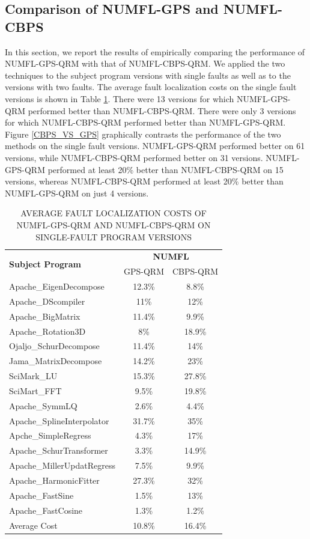 \subsection{Comparison of NUMFL-GPS and NUMFL-CBPS}
In this section, we report the results of empirically comparing the performance of NUMFL-GPS-QRM with that of NUMFL-CBPS-QRM.  We applied the two techniques to the subject program versions with single faults as well as to the versions with two faults.  The average fault localization costs on the single fault versions is shown in Table \ref{table5}.  There were 13 versions for which NUMFL-GPS-QRM performed better than NUMFL-CBPS-QRM. There were only 3 versions for which NUMFL-CBPS-QRM performed better than NUMFL-GPS-QRM. Figure \ref{CBPS_VS_GPS} graphically contrasts the performance of the two methods on the single fault versions.  NUMFL-GPS-QRM performed better on 61 versions, while NUMFL-CBPS-QRM performed better on 31 versions.  NUMFL-GPS-QRM performed at least 20\% better than NUMFL-CBPS-QRM on 15 versions, whereas NUMFL-CBPS-QRM performed at least 20\% better than NUMFL-GPS-QRM on just 4 versions.

\begin{table}[htbp!]
\caption{AVERAGE FAULT LOCALIZATION COSTS OF NUMFL-GPS-QRM AND NUMFL-CBPS-QRM ON SINGLE-FAULT PROGRAM VERSIONS }
\label{table5}
\centering
      \begin{tabular}{|l|c|c|}
      \hline
\multirow{2}{*}{{\bf Subject Program}}	&	\multicolumn{2}{|c|}{{\bf NUMFL}}	\\	\cline{2-3}
&  GPS-QRM	&CBPS-QRM \\ \hline
Apache\_EigenDecompose	&	12.3\%	&	8.8\%	\\	\hline
Apache\_DScompiler	&	11\%	&	12\%	\\	\hline
Apache\_BigMatrix	&	11.4\%	&	9.9\%	\\	\hline
Apache\_Rotation3D	&	8\%	&	18.9\%	\\	\hline
Ojaljo\_SchurDecompose	&	11.4\%	&	14\%	\\	\hline
Jama\_MatrixDecompose	&	14.2\%	&	23\%	\\	\hline
SciMark\_LU	&	15.3\%	&	27.8\%	\\	\hline
SciMart\_FFT	&	9.5\%	&	19.8\%	\\	\hline
Apache\_SymmLQ	&	2.6\%	&	4.4\%	\\	\hline
Apache\_SplineInterpolator	&	31.7\%	&	35\%	\\	\hline
Apche\_SimpleRegress	&	4.3\%	&	17\%	\\	\hline
Apache\_SchurTransformer	&	3.3\%	&	14.9\%	\\	\hline
Apache\_MillerUpdatRegress	&	7.5\%	&	9.9\%	\\	\hline
Apache\_HarmonicFitter	&	27.3\%	&	32\%	\\	\hline
Apache\_FastSine	&	1.5\%	&	13\%	\\	\hline
Apache\_FastCosine	&	1.3\%	&	1.2\%	\\	\hline
Average Cost	&	10.8\%	&	16.4\%	\\	\hline
\end{tabular}
\end{table}

